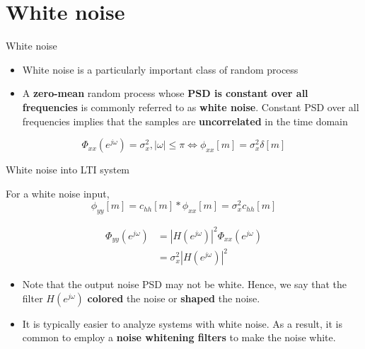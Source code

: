 \documentclass[10pt, aspectratio=169]{beamer}
\begin{document}
\section{White noise}
\begin{frame}{White noise}

\begin{itemize}
	\item White noise is a particularly important class of random process
	\item A \textbf{zero-mean} random process whose \textbf{PSD is constant over all frequencies} is commonly referred to as \textbf{white noise}. Constant PSD over all frequencies implies that the samples are \textbf{uncorrelated} in the time domain
\end{itemize}

\begin{equation*}
\Phi_{xx}(e^{j\omega}) = \sigma_x^2, |\omega|\leq\pi \Longleftrightarrow \phi_{xx}[m] = \sigma_x^2\delta[m]  
\end{equation*}

\begin{center}
	\resizebox{0.6\linewidth}{!}{}
\end{center}

\end{frame}

\begin{frame}{White noise into LTI system}

For a white noise input, 
\begin{equation*} \tag{output autocorrelation function}
\phi_{yy}[m] = c_{hh}[m]\ast \phi_{xx}[m] = \sigma_x^2c_{hh}[m]
\end{equation*}

\begin{align*} 
\Phi_{yy}(e^{j\omega}) &= |H(e^{j\omega})|^2\Phi_{xx}(e^{j\omega}) \\
&= \sigma_x^2|H(e^{j\omega})|^2 \tag{output PSD}
\end{align*}

\begin{itemize}
	\item Note that the output noise PSD may not be white. Hence, we say that the filter $H(e^{j\omega})$ \textbf{colored} the noise or \textbf{shaped} the noise.
	\item It is typically easier to analyze systems with white noise. As a result, it is common to employ a \textbf{noise whitening filters} to make the noise white. 
\end{itemize}


\end{frame}
\end{document}
